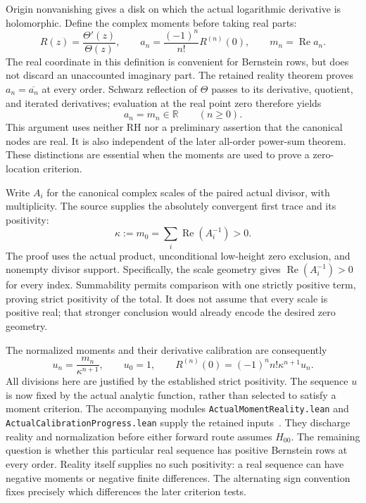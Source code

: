 \label{act:moments}
Origin nonvanishing gives a disk on which the actual logarithmic derivative
is holomorphic. Define the complex moments before taking real parts:
\begin{equation}\label{act:moment-definition}
 R(z)=\frac{\Theta'(z)}{\Theta(z)},\qquad
 a_n=\frac{(-1)^n}{n!}R^{(n)}(0),\qquad m_n=\operatorname{Re}a_n.
\end{equation}
The real coordinate in this definition is convenient for Bernstein rows,
but does not discard an unaccounted imaginary part. The retained reality
theorem proves $a_n=\overline{a_n}$ at every order. Schwarz reflection of
$\Theta$ passes to its derivative, quotient, and iterated derivatives;
evaluation at the real point zero therefore yields
\begin{equation}\label{act:moment-reality}
 a_n=m_n\in\mathbb R\qquad(n\ge0).
\end{equation}
This argument uses neither RH nor a preliminary assertion that the
canonical nodes are real. It is also independent of the later all-order
power-sum theorem. These distinctions are essential when the moments
are used to prove a zero-location criterion.

Write $A_i$ for the canonical complex scales of the paired actual
divisor, with multiplicity. The source supplies the absolutely convergent
first trace and its positivity:
\begin{equation}\label{act:kappa-trace}
 \kappa:=m_0=\sum_i\operatorname{Re}(A_i^{-1})>0.
\end{equation}
The proof uses the actual product, unconditional low-height zero exclusion,
and nonempty divisor support. Specifically, the scale geometry gives
$\operatorname{Re}(A_i^{-1})>0$ for every index. Summability permits comparison
with one strictly positive term, proving strict positivity of the total.
It does not assume that every scale is positive real; that stronger
conclusion would already encode the desired zero geometry.

The normalized moments and their derivative calibration are consequently
\begin{equation}\label{act:normalized-moments}
 u_n=\frac{m_n}{\kappa^{n+1}},\qquad u_0=1,\qquad
 R^{(n)}(0)=(-1)^n n!\kappa^{n+1}u_n.
\end{equation}
All divisions here are justified by the established strict positivity.
The sequence $u$ is now fixed by the actual analytic function, rather
than selected to satisfy a moment criterion. The accompanying modules
\texttt{ActualMomentReality.lean} and
\texttt{ActualCalibrationProgress.lean} supply the retained inputs~\cite{source}.
They discharge reality and normalization before either forward route
assumes $H_{00}$. The remaining question is whether this particular real
sequence has positive Bernstein rows at every order.
Reality itself supplies no such positivity: a real sequence can have
negative moments or negative finite differences. The alternating sign
convention fixes precisely which differences the later criterion tests.

